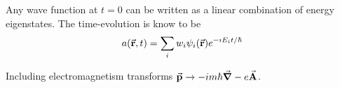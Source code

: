 \documentclass[a4paper,twoside,master.tex]{subfiles}
\begin{document}
Any wave function at $ t=0 $ can be written as a linear combination of energy eigenstates. The time-evolution is know to be
\begin{equation}
    a(\va{r}, t) = \sum_i w_i \psi_i(\va{r}) e^{- \imath E_i t/ \hbar}
\end{equation}

Including electromagnetism transforms $ \va{p} \to -im \hbar \grad - e \va{A} $.
\end{document}
